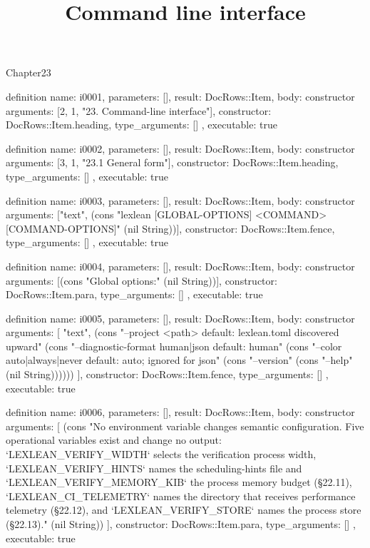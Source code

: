 \begin{lexlean}{Chapter23}
\title{Command line interface}
\begin{semanticmodule}
definition{
  name: i0001,
  parameters: [],
  result: DocRows::Item,
  body: constructor{
    arguments: [2, 1, "23. Command-line interface"],
    constructor: DocRows::Item.heading,
    type_arguments: []
  },
  executable: true
}

definition{
  name: i0002,
  parameters: [],
  result: DocRows::Item,
  body: constructor{
    arguments: [3, 1, "23.1 General form"],
    constructor: DocRows::Item.heading,
    type_arguments: []
  },
  executable: true
}

definition{
  name: i0003,
  parameters: [],
  result: DocRows::Item,
  body: constructor{
    arguments: ["text", (cons "lexlean [GLOBAL-OPTIONS] <COMMAND> [COMMAND-OPTIONS]" (nil String))],
    constructor: DocRows::Item.fence,
    type_arguments: []
  },
  executable: true
}

definition{
  name: i0004,
  parameters: [],
  result: DocRows::Item,
  body: constructor{
    arguments: [(cons "Global options:" (nil String))],
    constructor: DocRows::Item.para,
    type_arguments: []
  },
  executable: true
}

definition{
  name: i0005,
  parameters: [],
  result: DocRows::Item,
  body: constructor{
    arguments: [
      "text",
      (cons "--project <path>                  default: lexlean.toml discovered upward" (cons "--diagnostic-format human|json    default: human" (cons "--color auto|always|never         default: auto; ignored for json" (cons "--version" (cons "--help" (nil String))))))
    ],
    constructor: DocRows::Item.fence,
    type_arguments: []
  },
  executable: true
}

definition{
  name: i0006,
  parameters: [],
  result: DocRows::Item,
  body: constructor{
    arguments: [
      (cons "No environment variable changes semantic configuration. Five operational variables exist and change no output: `LEXLEAN_VERIFY_WIDTH` selects the verification process width, `LEXLEAN_VERIFY_HINTS` names the scheduling-hints file and `LEXLEAN_VERIFY_MEMORY_KIB` the process memory budget (§22.11), `LEXLEAN_CI_TELEMETRY` names the directory that receives performance telemetry (§22.12), and `LEXLEAN_VERIFY_STORE` names the process store (§22.13)." (nil String))
    ],
    constructor: DocRows::Item.para,
    type_arguments: []
  },
  executable: true
}


\end{semanticmodule}
\end{lexlean}
